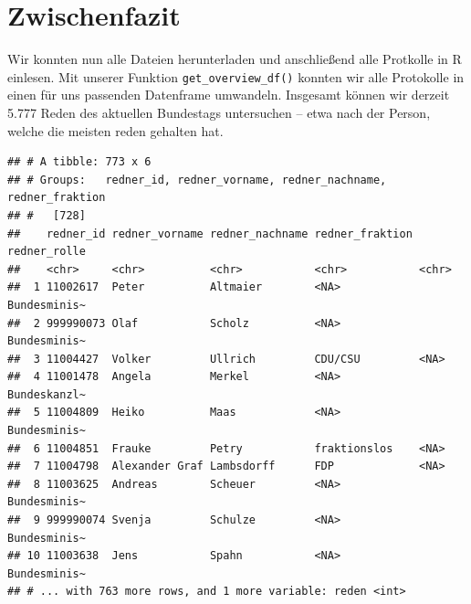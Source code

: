 \documentclass[oneside, 12pt]{scrbook}
\newenvironment{Shaded}{\begin{snugshade}}{\end{snugshade}}
\newcommand{\DataTypeTok}[1]{\textcolor[rgb]{0.13,0.29,0.53}{#1}}
\newcommand{\KeywordTok}[1]{\textcolor[rgb]{0.13,0.29,0.53}{\textbf{#1}}}
\newcommand{\NormalTok}[1]{#1}
\newcommand{\OperatorTok}[1]{\textcolor[rgb]{0.81,0.36,0.00}{\textbf{#1}}}
\newcommand{\StringTok}[1]{\textcolor[rgb]{0.31,0.60,0.02}{#1}}
\theoremstyle{definition}
\theoremstyle{definition}
\theoremstyle{definition}
\theoremstyle{remark}
\begin{document}
\hypertarget{zwischenfazit-1}{%
\section{Zwischenfazit}\label{zwischenfazit-1}}

Wir konnten nun alle Dateien herunterladen und anschließend alle
Protkolle in R einlesen. Mit unserer Funktion
\texttt{get\_overview\_df()} konnten wir alle Protokolle in einen für
uns passenden Datenframe umwandeln. Insgesamt können wir derzeit 5.777
Reden des aktuellen Bundestags untersuchen -- etwa nach der Person,
welche die meisten reden gehalten hat.

\begin{Shaded}
\end{Shaded}

\begin{verbatim}
## # A tibble: 773 x 6
## # Groups:   redner_id, redner_vorname, redner_nachname, redner_fraktion
## #   [728]
##    redner_id redner_vorname redner_nachname redner_fraktion redner_rolle
##    <chr>     <chr>          <chr>           <chr>           <chr>       
##  1 11002617  Peter          Altmaier        <NA>            Bundesminis~
##  2 999990073 Olaf           Scholz          <NA>            Bundesminis~
##  3 11004427  Volker         Ullrich         CDU/CSU         <NA>        
##  4 11001478  Angela         Merkel          <NA>            Bundeskanzl~
##  5 11004809  Heiko          Maas            <NA>            Bundesminis~
##  6 11004851  Frauke         Petry           fraktionslos    <NA>        
##  7 11004798  Alexander Graf Lambsdorff      FDP             <NA>        
##  8 11003625  Andreas        Scheuer         <NA>            Bundesminis~
##  9 999990074 Svenja         Schulze         <NA>            Bundesminis~
## 10 11003638  Jens           Spahn           <NA>            Bundesminis~
## # ... with 763 more rows, and 1 more variable: reden <int>
\end{verbatim}
\end{document}
